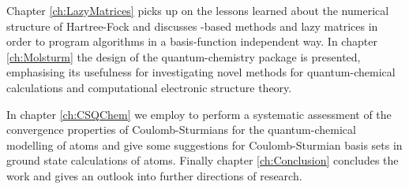 Chapter \ref{ch:LazyMatrices}
picks up on the lessons learned about the numerical structure
of Hartree-Fock and discusses
\contraction-based methods and lazy matrices
in order to program algorithms
in a basis-function independent way.
In chapter \ref{ch:Molsturm} the design of the quantum-chemistry
package \molsturm is presented,
emphasising its usefulness for investigating novel methods
for quantum-chemical calculations
and computational electronic structure theory.

In chapter \ref{ch:CSQChem} we employ \molsturm
to perform a systematic assessment of
the convergence properties of Coulomb-Sturmians
for the quantum-chemical modelling of atoms
and give some suggestions for Coulomb-Sturmian basis sets
in ground state calculations of atoms.
Finally chapter \ref{ch:Conclusion} concludes the work and gives
an outlook into further directions of research.

